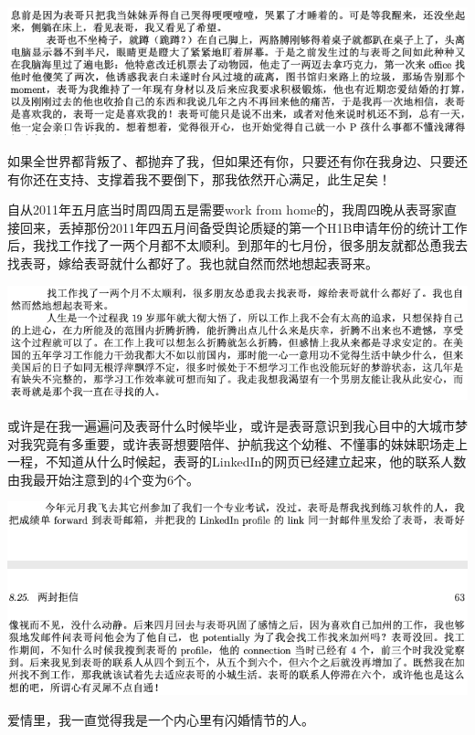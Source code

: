 \documentclass[9pt, b5paper]{article}
\begin{document}
\begin{center}
\includegraphics[width=.9\linewidth]{./pic/p1p53-2.png}
\end{center}

如果全世界都背叛了、都抛弃了我，但如果还有你，只要还有你在我身边、只要还有你还在支持、支撑着我不要倒下，那我依然开心满足，此生足矣！

自从2011年五月底当时周四周五是需要work from home的，我周四晚从表哥家直接回来，丢掉那份2011年四五月间备受舆论质疑的第一个H1B申请年份的统计工作后，我找工作找了一两个月都不太顺利。到那年的七月份，很多朋友就都怂恿我去找表哥，嫁给表哥就什么都好了。我也就自然而然地想起表哥来。

\begin{center}
\includegraphics[width=.9\linewidth]{./pic/p1p62.png}
\end{center}

或许是在我一遍遍问及表哥什么时候毕业，或许是表哥意识到我心目中的大城市梦对我究竟有多重要，或许表哥想要陪伴、护航我这个幼稚、不懂事的妹妹职场走上一程，不知道从什么时候起，表哥的LinkedIn的网页已经建立起来，他的联系人数由我最开始注意到的4个变为6个。

\begin{center}
\includegraphics[width=.9\linewidth]{./pic/p1p63-1.png}
\end{center}

爱情里，我一直觉得我是一个内心里有闪婚情节的人。
\end{document}
